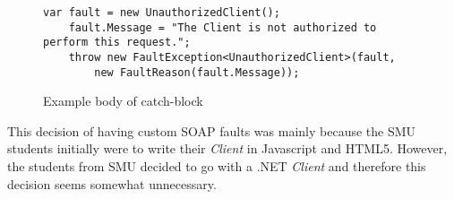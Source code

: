 \documentclass[../report.tex]{subfiles}
\begin{document}
\begin{figure}[H]
\begin{lstlisting}[frame=tb]
    var fault = new UnauthorizedClient();
    fault.Message = "The Client is not authorized to perform this request.";
    throw new FaultException<UnauthorizedClient>(fault, 
        new FaultReason(fault.Message));
\end{lstlisting}
\caption{Example body of catch-block}
\end{figure}

This decision of having custom SOAP faults was mainly because the SMU students initially were to write their \textit{Client} in Javascript and HTML5. However, the students from SMU decided to go with a .NET \textit{Client} and therefore this decision seems somewhat unnecessary. 
\end{document}
